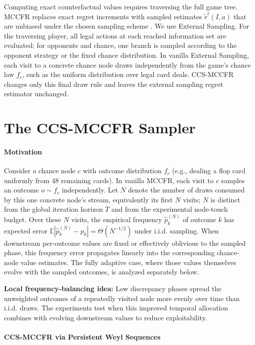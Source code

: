 \documentclass[11pt]{article}
\begin{document}
Computing exact counterfactual values requires traversing the full game tree. MCCFR replaces exact regret increments with sampled estimates $\tilde r^t(I,a)$ that are unbiased under the chosen sampling scheme \citep{lanctot2009monte}. We use External Sampling. For the traversing player, all legal actions at each reached information set are evaluated; for opponents and chance, one branch is sampled according to the opponent strategy or the fixed chance distribution. In vanilla External Sampling, each visit to a concrete chance node draws independently from the game's chance law $f_c$, such as the uniform distribution over legal card deals. CCS-MCCFR changes only this final draw rule and leaves the external sampling regret estimator unchanged.

\section{The CCS-MCCFR Sampler}
\label{sec:method}

\paragraph{Motivation}

Consider a chance node $c$ with outcome distribution $f_c$ (e.g., dealing a flop card uniformly from 48 remaining cards). In vanilla MCCFR, each visit to $c$ samples an outcome $o \sim f_c$ independently. Let $N$ denote the number of draws consumed by this one concrete node's stream, equivalently its first $N$ visits; $N$ is distinct from the global iteration horizon $T$ and from the experimental node-touch budget. Over these $N$ visits, the empirical frequency $\hat{p}_k^{(N)}$ of outcome $k$ has expected error $\mathbb{E}|\hat{p}_k^{(N)} - p_k| = \Theta(N^{-1/2})$ under i.i.d. sampling. When downstream per-outcome values are fixed or effectively oblivious to the sampled phase, this frequency error propagates linearly into the corresponding chance-node value estimates. The fully adaptive case, where those values themselves evolve with the sampled outcomes, is analyzed separately below.

\textbf{Local frequency-balancing idea:} Low discrepancy phases spread the unweighted outcomes of a repeatedly visited node more evenly over time than i.i.d. draws. The experiments test when this improved temporal allocation combines with evolving downstream values to reduce exploitability.

\paragraph{CCS-MCCFR via Persistent Weyl Sequences}
\end{document}
